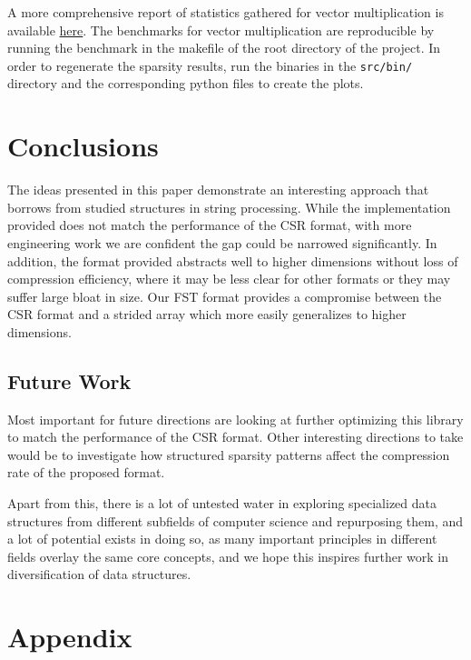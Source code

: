 \documentclass[12pt]{article}
\begin{document}
A more comprehensive report of statistics gathered for vector multiplication is available
\href{https://htmlpreview.github.io/?https://raw.githubusercontent.com/JulianKnodt/mat-fst/master/reports/vecmul/report/index.html}{here}.
The benchmarks for vector multiplication are reproducible by running the benchmark in the makefile of the root directory of the
project. In order to regenerate the sparsity results, run the binaries in the
\lstinline{src/bin/} directory and the corresponding python files to create the plots.


\section*{Conclusions}
The ideas presented in this paper demonstrate an interesting approach that borrows from
studied structures in string processing. While the implementation provided does not match the
performance of the CSR format, with more engineering work we are confident the gap could be
narrowed significantly. In addition, the format provided abstracts well to higher dimensions
without loss of compression efficiency, where it may be less clear for other formats or they may
suffer large bloat in size. Our FST format provides a compromise between the CSR format and a
strided array which more easily generalizes to higher dimensions.

\subsection*{Future Work}
Most important for future directions are looking at further optimizing this library to match the
performance of the CSR format. Other interesting directions to take would be to investigate how
structured sparsity patterns affect the compression rate of the proposed format.

Apart from this, there is a lot of untested water in exploring specialized data structures from
different subfields of computer science and repurposing them, and a lot of potential exists in
doing so, as many important principles in different fields overlay the same core concepts, and
we hope this inspires further work in diversification of data structures.




\newpage
\appendix
\section{Appendix}
\end{document}
